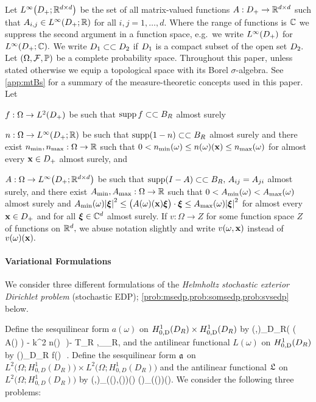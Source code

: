 Let $\LiDpRRdtd$ be the set of all matrix-valued functions $A:D_{+}\rightarrow\mathbb R^{d\times d}$ such that $A_{i,j} \in \LiDpRR$ for all $i,j = 1,\ldots,d.$ Where the range of functions is $\mathbb C$ we suppress the second argument in a function space, e.g.~we write $\LiDp$ for $\LiDpCC.$ We write $D_{1} \subset\subset D_{2}$ if $D_{1}$ is a compact subset of the open set $D_{2}.$ Let $\OFP$ be a complete probability space. Throughout this paper, unless stated otherwise we equip a topological space with its Borel $\sigma$-algebra. See \cref{app:mtBs} for a summary of the measure-theoretic concepts used in this paper. Let
\bit
\item $f:\Omega\rightarrow\LtDp$ be such that $\operatorname{supp} f \subset\subset B_{R}$ almost surely
\item $n:\Omega\rightarrow \LiDpRR$ be such that $\operatorname{supp}(1-n) \subset\subset B_{R}$ almost surely and there exist $n_{\min}, n_{\max}:\Omega\rightarrow \mathbb R$ such that
$0 < n_{\min}(\omega) \leq n(\omega)(\mathbf{x}) \leq n_{\max}(\omega)$
for almost every $\mathbf{x} \in D_{+}$ almost surely, and
\item $A:\Omega\rightarrow\LiDpRRdtd$ be such that $\operatorname{supp}(I-A) \subset\subset B_{R},\, A_{ij} = A_{ji}$ almost surely, and there exist $A_{\min},A_{\max}:\Omega \rightarrow \mathbb R$ such that $0 < A_{\min}(\omega) < A_{\max}(\omega)$ almost surely and
$\Amin(\omega)\abs{\bxi}^2 \leq \big(A(\omega)(\bx)\bxi\big)\cdot\bxi \leq \Amax(\omega)\abs{\bxi}^2$
for almost every $\mathbf{x} \in D_{+}$ and for all $\boldsymbol{\xi} \in \mathbb C^{d}$ almost surely.
\eit
If $v:\Omega \rightarrow Z$ for some function space $Z$ of functions on $\mathbb R^{d},$ we abuse notation slightly and write $v(\omega,\mathbf{x})$ instead of $v(\omega)(\mathbf{x}).$




\paragraph{Variational Formulations} We consider three different formulations of the  \emph{Helmholtz stochastic exterior Dirichlet problem} (stochastic EDP); \cref{prob:msedp,prob:somsedp,prob:svsedp} below.

Define the sesquilinear form $a(\omega)$ on $\HozDDR \times \HozDDR$ by
\beq\label{eq:SEDPa}
\mleft(\vo,\vt\mright)\de\int_{D_R}\Big( \mleft( A(\omega) \grad \vo\mright)\cdot \grad \vtb 
 - k^2 n(\omega)\, \vo\,\vtb \Big)\dd\Leb- \big\langle T_R \gamma \vo,\gamma \vt\big\rangle_{\Gamma_R},
 \eeq
 and the antilinear functional $L(\omega)$ on $\HozDDR$ by
\beq\label{eq:SEDPL}
(\vt)\de \int_{D_R} f(\omega)\, \vtb\,\dd\Leb.
\eeq
Define the sesquilinear form $\mathfrak{a}$ on $L^2\big(\Omega;H_{0,D}^1(D_R)\big)\times L^2\big(\Omega;H_{0,D}^1(D_R)\big)$ and the antilinear functional $\mathfrak{L}$ on $L^2\big(\Omega;H_{0,D}^1(D_R)\big)$ by 
\beq\label{eq:SEDPas}
\as\mleft(\vo,\vt\mright)\de \int_\Omega {}\mleft(\vo(\omega),\vt(\omega)\mright)\dd\PP(\omega)
\quad{} \quad
%
\Ls(\vt)\de \int_\Omega {}\mleft(\vt(\omega)\mright)\dd\PP(\omega).
\eeq
We consider the following three problems:

